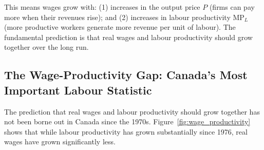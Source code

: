 This means wages grow with: (1) increases in the output price $P$ (firms
can pay more when their revenues rise); and (2) increases in labour
productivity $\text{MP}_L$ (more productive workers generate more revenue
per unit of labour). The fundamental prediction is that real wages and
labour productivity should grow together over the long run.

\subsection{The Wage-Productivity Gap: Canada's Most Important Labour Statistic}

The prediction that real wages and labour productivity should grow together
has not been borne out in Canada since the 1970s. Figure~\ref{fig:wage_productivity}
shows that while labour productivity has grown substantially since 1976,
real wages have grown significantly less.

